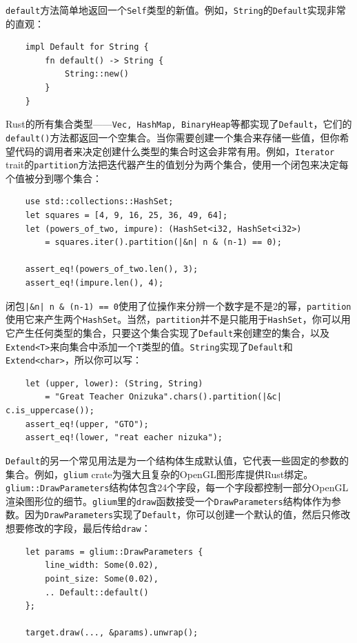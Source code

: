 \texttt{default}方法简单地返回一个\texttt{Self}类型的新值。例如，\texttt{String}的\texttt{Default}实现非常的直观：
\begin{verbatim}
    impl Default for String {
        fn default() -> String {
            String::new()
        }
    }    
\end{verbatim}

Rust的所有集合类型——\texttt{Vec, HashMap, BinaryHeap}等都实现了\texttt{Default}，它们的\\
\texttt{default()}方法都返回一个空集合。当你需要创建一个集合来存储一些值，但你希望代码的调用者来决定创建什么类型的集合时这会非常有用。例如，\texttt{Iterator} trait的\texttt{partition}方法把迭代器产生的值划分为两个集合，使用一个闭包来决定每个值被分到哪个集合：
\begin{verbatim}
    use std::collections::HashSet;
    let squares = [4, 9, 16, 25, 36, 49, 64];
    let (powers_of_two, impure): (HashSet<i32, HashSet<i32>)
        = squares.iter().partition(|&n| n & (n-1) == 0);
    
    assert_eq!(powers_of_two.len(), 3);
    assert_eq!(impure.len(), 4);
\end{verbatim}

闭包\texttt{|\&n| n \& (n-1) == 0}使用了位操作来分辨一个数字是不是2的幂，\texttt{partition}使用它来产生两个\texttt{HashSet}。当然，\texttt{partition}并不是只能用于\texttt{HashSet}，你可以用它产生任何类型的集合，只要这个集合实现了\texttt{Default}来创建空的集合，以及\texttt{Extend<T>}来向集合中添加一个\texttt{T}类型的值。\texttt{String}实现了\texttt{Default}和\texttt{Extend<char>}，所以你可以写：
\begin{verbatim}
    let (upper, lower): (String, String)
        = "Great Teacher Onizuka".chars().partition(|&c| c.is_uppercase());
    assert_eq!(upper, "GTO");
    assert_eq!(lower, "reat eacher nizuka");
\end{verbatim}

\texttt{Default}的另一个常见用法是为一个结构体生成默认值，它代表一些固定的参数的集合。例如，\texttt{glium} crate为强大且复杂的OpenGL图形库提供Rust绑定。\texttt{glium::DrawParameters}结构体包含24个字段，每一个字段都控制一部分OpenGL渲染图形位的细节。\texttt{glium}里的\texttt{draw}函数接受一个\texttt{DrawParameters}结构体作为参数。因为\texttt{DrawParameters}实现了\texttt{Default}，你可以创建一个默认的值，然后只修改想要修改的字段，最后传给\texttt{draw}：
\begin{verbatim}
    let params = glium::DrawParameters {
        line_width: Some(0.02),
        point_size: Some(0.02),
        .. Default::default()
    };

    target.draw(..., &params).unwrap();
\end{verbatim}


